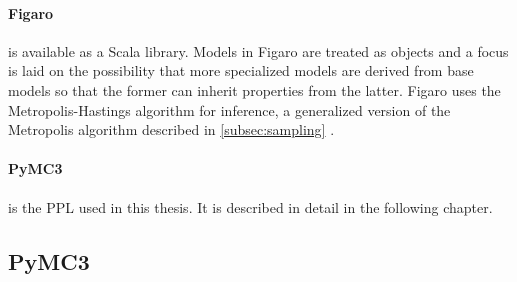 \documentclass{article}
\begin{document}
\paragraph{Figaro}
is available as a Scala library. Models in Figaro are treated as objects and a focus is laid on the possibility that more specialized models are derived from base models so that the former can inherit properties from the latter. Figaro uses the Metropolis-Hastings algorithm for inference, a generalized version of the Metropolis algorithm described in \autoref{subsec:sampling} \cite{pfeffer2009figaro}.
\paragraph{PyMC3}
is the PPL used in this thesis. It is described in detail in the following chapter.




\subsection{PyMC3}
\end{document}
